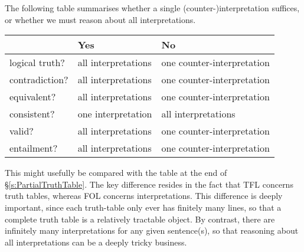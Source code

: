 The following table summarises whether a single (counter-)interpretation suffices, or whether we must reason about all interpretations.


\begin{center}
\begin{tabular}{l l l}
 & \textbf{Yes} & \textbf{No}\\
 \hline
logical truth? & all interpretations & one counter-interpretation\\
contradiction? &  all interpretations  & one counter-interpretation\\
equivalent? & all interpretations & one counter-interpretation\\
consistent? & one interpretation & all interpretations\\
valid? & all interpretations & one counter-interpretation\\
entailment? & all interpretations & one counter-interpretation\\
\end{tabular}
\end{center}
\label{table.ModelOrArgument}

This might usefully be compared with the table at the end of \S\ref{s:PartialTruthTable}. The key difference resides in the fact that TFL concerns truth tables, whereas FOL concerns interpretations. This difference is deeply important, since each truth-table only ever has finitely many lines, so that a complete truth table is a relatively tractable object. By contrast, there are infinitely many interpretations for any given sentence(s), so that reasoning about all interpretations can be a deeply tricky business.
